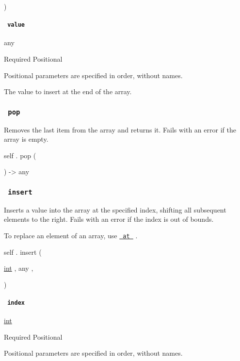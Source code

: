 )

\paragraph{\texorpdfstring{\texttt{\ value\ }}{ value }}\label{definitions-push-value}

{ any }

{Required} {{ Positional }}

\label{definitions-push-value-positional-tooltip}
Positional parameters are specified in order, without names.

The value to insert at the end of the array.

\subsubsection{\texorpdfstring{\texttt{\ pop\ }}{ pop }}\label{definitions-pop}

Removes the last item from the array and returns it. Fails with an error
if the array is empty.

self { . } { pop } (

) -\textgreater{} { any }

\subsubsection{\texorpdfstring{\texttt{\ insert\ }}{ insert }}\label{definitions-insert}

Inserts a value into the array at the specified index, shifting all
subsequent elements to the right. Fails with an error if the index is
out of bounds.

To replace an element of an array, use
\href{/docs/reference/foundations/array/\#definitions-at}{\texttt{\ at\ }}
.

self { . } { insert } (

{ \href{/docs/reference/foundations/int/}{int} , } { { any } , }

)

\paragraph{\texorpdfstring{\texttt{\ index\ }}{ index }}\label{definitions-insert-index}

\href{/docs/reference/foundations/int/}{int}

{Required} {{ Positional }}

\label{definitions-insert-index-positional-tooltip}
Positional parameters are specified in order, without names.

